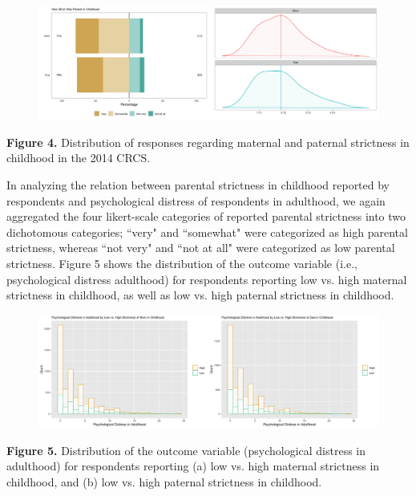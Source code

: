 \documentclass[12pt,letterpaper]{article}
\begin{document}
\begin{figure}[H]
	\centering
	\includegraphics[scale=0.3]{likert2.png}
\end{figure}	
\begin{center}
	\singlespacing
	\textbf{Figure 4.} Distribution of responses regarding maternal and paternal strictness in childhood in the 2014 CRCS.
\end{center}

In analyzing the relation between parental strictness in childhood reported by respondents and psychological distress of respondents in adulthood, we again aggregated the four likert-scale categories of reported parental strictness into two dichotomous categories; ``very" and ``somewhat" were categorized as high parental strictness, whereas ``not very" and ``not at all" were categorized as low parental strictness. Figure 5 shows the distribution of the outcome variable (i.e., psychological distress adulthood) for respondents reporting low vs. high maternal strictness in childhood, as well as low vs. high paternal strictness in childhood. 

\begin{figure}[H]
	\centering
	\includegraphics[scale=0.32]{histogram2.png}
\end{figure}	

\begin{center}
	\singlespacing
	\textbf{Figure 5.} Distribution of the outcome variable (psychological distress in adulthood) for respondents reporting (a) low vs. high maternal strictness in childhood, and (b) low vs. high paternal strictness in childhood. 
\end{center}
\end{document}
